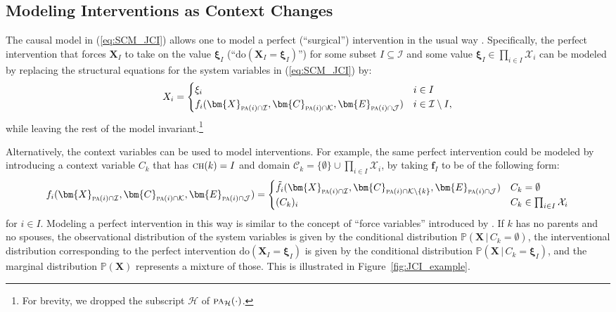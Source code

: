 \documentclass[twoside,11pt]{article}
\newcommand{\Prb}{\mathbb{P}}
\newcommand\B[1]{\bm{#1}}
\newcommand\C[1]{\mathcal{#1}}
\newcommand\mathbfsc[1]{\text{\normalfont\scshape#1}}
\newcommand\pa[1]{\mathbfsc{pa}(#1)}
\newcommand\ch[1]{\mathbfsc{ch}(#1)}
\newcommand\pasub[2]{\mathbfsc{pa}_{#1}(#2)}
\newcommand\given{\,|\,}
\newcommand\eref[1]{(\ref{#1})}
\begin{document}
\subsection{Modeling Interventions as Context Changes}\label{sec:modeling_interventions}

The causal model in \eref{eq:SCM_JCI} allows one to model a perfect (``surgical'') 
intervention in the usual way \citep{Pearl2009}. Specifically, the perfect intervention that forces $\B{X}_{I}$ to take on the value $\B{\xi}_I$ (``$\mathrm{do}(\B{X}_I=\B{\xi}_I)$'') for some subset $I\subseteq \C{I}$ and some value $\B{\xi}_I \in \prod_{i\in I} \C{X}_i$ can be modeled by replacing the structural equations for the system variables in \eref{eq:SCM_JCI} by:
$$X_i = \begin{cases}
    \xi_i & i \in I\\
    f_i( \B{X}_{\pa{i} \cap \C{I}}, \B{C}_{\pa{i} \cap \C{K}}, \B{E}_{\pa{i} \cap \C{J}}) & i \in \C{I}\setminus I,\\
  \end{cases}$$
while leaving the rest of the model invariant.\footnote{For brevity, we dropped the subscript $\C{H}$ of $\pasub{\C{H}}{\cdot}$.}

Alternatively, the context variables can be used to model interventions. For example, the same perfect intervention could
be modeled by introducing a context variable $C_k$ that has $\ch{k} = I$ and domain $\C{C}_k = \{\emptyset\} \cup \prod_{i\in I} \C{X}_i$, by taking $\B{f}_I$ to be of the following form:
\begin{equation}\label{eq:perfect_intv}
  f_i( \B{X}_{\pa{i} \cap \C{I}}, \B{C}_{\pa{i} \cap \C{K}}, \B{E}_{\pa{i} \cap \C{J}}) =
  \begin{cases}
    \tilde f_i( \B{X}_{\pa{i} \cap \C{I}}, \B{C}_{\pa{i} \cap \C{K} \setminus \{k\}}, \B{E}_{\pa{i} \cap \C{J}}) & C_k = \emptyset \\
    (C_k)_i & C_k \in \prod_{i\in I} \C{X}_i
  \end{cases}
\end{equation}
for $i \in I$.
Modeling a perfect intervention in this way is similar to the concept of ``force variables'' introduced by \citet{Pearl1993b}.
If $k$ has no parents and no spouses, the observational distribution of the system variables is given by
the conditional distribution $\Prb(\B{X} \given C_k = \emptyset)$, the interventional
distribution corresponding to the perfect intervention $\mathrm{do}(\B{X}_I = \B{\xi}_I)$ is given by
the conditional distribution $\Prb(\B{X} \given C_k = \B{\xi}_I)$, and the marginal distribution 
$\Prb(\B{X})$ represents a mixture of those. This is illustrated in Figure~\ref{fig:JCI_example}.
\end{document}
